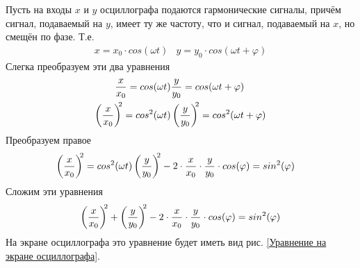 \documentclass[a4paper, usenames, dvipsnames]{article}
\begin{document}
Пусть на входы $x$ и $y$ осциллографа подаются гармонические сигналы,
причём сигнал, подаваемый на $y$, имеет ту же частоту,
что и сигнал, подаваемый на $x$, но смещён по фазе. Т.е.
\begin{eqnarray*}
    x = x_0 \cdot cos(\omega t) & y = y_0 \cdot cos(\omega t + \varphi)
\end{eqnarray*}
Слегка преобразуем эти два уравнения
\begin{eqnarray*}
    \dfrac{x}{x_0} = cos(\omega t) & \dfrac{y}{y_0} = cos(\omega t + \varphi) \\
    \left(\dfrac{x}{x_0}\right)^{\hspace{-0.3em}2} = cos^2(\omega t) & \left(\dfrac{y}{y_0}\right)^{\hspace{-0.3em}2} = cos^2(\omega t + \varphi) \\
\end{eqnarray*}
Преобразуем правое
\begin{eqnarray*}
    \left(\dfrac{x}{x_0}\right)^{\hspace{-0.3em}2} = cos^2(\omega t) & \left(\dfrac{y}{y_0}\right)^{\hspace{-0.3em}2} - 2 \cdot \dfrac{x}{x_0} \cdot \dfrac{y}{y_0} \cdot cos(\varphi) = sin^2(\varphi)
\end{eqnarray*}
Сложим эти уравнения
\begin{gather*}
    \left(\dfrac{x}{x_0}\right)^{\hspace{-0.3em}2} + \left(\dfrac{y}{y_0}\right)^{\hspace{-0.3em}2} - 2 \cdot \dfrac{x}{x_0} \cdot \dfrac{y}{y_0} \cdot cos(\varphi) = sin^2(\varphi)
\end{gather*}
На экране осциллографа это уравнение будет иметь вид рис. \ref{Уравнение на экране осциллографа}.
\end{document}
